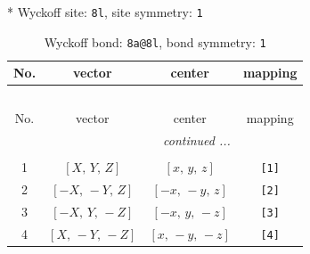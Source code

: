 \documentclass[fleqn,8pt]{jsarticle}
\begin{document}
* Wyckoff site: {\tt 8l}, site symmetry: {\tt 1}
\renewcommand{\arraystretch}{1.2}
\begin{longtable}{cccc}
\caption{Wyckoff bond: {\tt 8a@8l}, bond symmetry: {\tt 1}}
 \\
 \hline \hline
No. & vector & center & mapping \\ \hline \endfirsthead

\multicolumn{3}{l}{\tablename\ \thetable{}} \\
 \hline \hline
No. & vector & center & mapping \\ \hline \endhead

 \hline \hline
\multicolumn{3}{r}{\footnotesize\it continued ...} \\ \endfoot

 \hline \hline
\multicolumn{3}{r}{} \\ \endlastfoot

1 & $\left[ X,\, Y,\, Z \right]$ & $\left[ x,\, y,\, z \right]$ & {\tt [1]} \\ \hline
2 & $\left[ - X,\, - Y,\, Z \right]$ & $\left[ - x,\, - y,\, z \right]$ & {\tt [2]} \\ \hline
3 & $\left[ - X,\, Y,\, - Z \right]$ & $\left[ - x,\, y,\, - z \right]$ & {\tt [3]} \\ \hline
4 & $\left[ X,\, - Y,\, - Z \right]$ & $\left[ x,\, - y,\, - z \right]$ & {\tt [4]} \\
\end{longtable}
\end{document}
